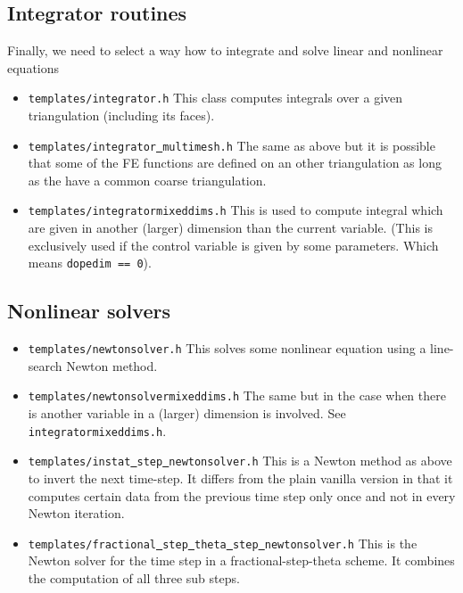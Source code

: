 \subsection{Integrator routines}
Finally, we need to select a way how to integrate and solve linear and nonlinear equations
\begin{itemize}
\item \texttt{templates/integrator.h} This class computes integrals over a given 
  triangulation (including its faces).
\item \texttt{templates/integrator\underline{ }multimesh.h} The same as above but it is 
  possible that some of the FE functions are defined on an other triangulation 
  as long as the have a common coarse triangulation.
\item \texttt{templates/integratormixeddims.h} This is used to compute integral which 
  are given in another (larger) dimension than the current variable. (This is exclusively
  used if the control variable is given by some parameters. Which means \texttt{dopedim == 0}). 
\end{itemize}

\subsection{Nonlinear solvers}
\begin{itemize}
\item \texttt{templates/newtonsolver.h} This solves some nonlinear equation using a 
  line-search Newton method.
\item \texttt{templates/newtonsolvermixeddims.h} The same but in the case when there is 
  another variable in a (larger) dimension is involved. See 
  \texttt{integratormixeddims.h}.
\item \texttt{templates/instat\underline{ }step\underline{ }newtonsolver.h} This is a 
  Newton method as above to invert the next time-step. It differs from the plain vanilla
  version in that it computes certain data from the previous time step only once 
  and not in every Newton iteration.
\item \texttt{templates/fractional\underline{ }step\underline{ }theta\underline{ }step\underline{ }newtonsolver.h} This is the Newton solver for the time step in a 
  fractional-step-theta scheme. It combines the computation of all three sub steps.
\end{itemize}

